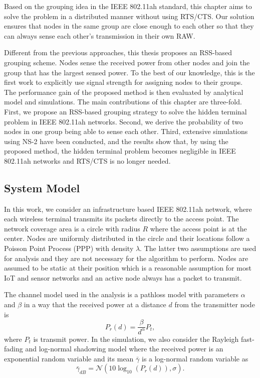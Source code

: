   Based on the grouping idea in the IEEE 802.11ah standard, this chapter aims to solve the problem in a distributed manner without using RTS/CTS. Our solution ensures that nodes in the same group are close enough to each other so that they can always sense each other's transmission in their own RAW. 

Different from the previous approaches, this thesis proposes an RSS-based grouping scheme.
Nodes sense the received power from other nodes and join the group that has the largest sensed power. To the best of our knowledge, this is the first work to explicitly use signal strength for assigning nodes to their groups. The performance gain of the proposed method is then evaluated by analytical model and simulations. The main contributions of this chapter are three-fold. First, we propose an RSS-based grouping strategy to solve the hidden terminal problem in IEEE 802.11ah networks. Second, we derive the probability of two nodes in one group being able to sense each other. Third, extensive simulations using NS-2\cite{breslau2000advances} have been conducted, and the results show that, by using the proposed method, the hidden terminal problem becomes negligible in IEEE 802.11ah networks and RTS/CTS is no longer needed.


\subsection{System Model} \label{systemmodel}

In this work, we consider an infrastructure based IEEE 802.11ah network, where each wireless terminal transmits its packets directly to the access point. %
The network coverage area is a circle with radius $R$ where the access point is at the center. Nodes are uniformly distributed in the circle and their locations follow a Poisson Point Process (PPP) with density $\lambda$. The latter two assumptions are used for analysis and they are not necessary for the algorithm to perform. Nodes are assumed to be static at their position which is a reasonable assumption for most IoT and sensor networks and an active node always has a packet to transmit. %

The channel model used in the analysis is a pathloss model with parameters $\alpha$ and $\beta$ in a way that the received power at a distance $d$ from the transmitter node is
\begin{equation}
P_r(d)=\frac{\beta}{d^\alpha} P_t,
\end{equation}
where $P_t$ is transmit power. In the simulation, we also consider the Rayleigh fast-fading and log-normal shadowing model where the received power is an exponential random variable and its mean $\bar{\gamma}$ is a log-normal random variable as 
\begin{equation}
\bar{\gamma}_{dB}= \mathcal{N}(10\log_{10}(P_r(d)),\sigma).
\end{equation}

